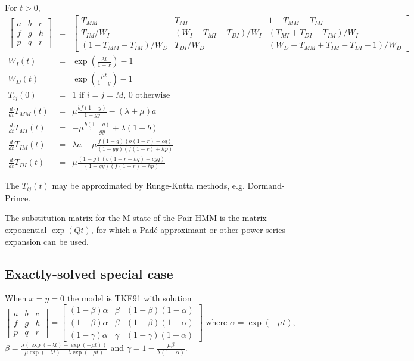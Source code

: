 \documentclass{article}
\begin{document}
For $t>0$, %
\begin{eqnarray*}
\begin{bmatrix}
a & b & c \\
f & g & h \\
p & q & r 
\end{bmatrix}
& = &
\begin{bmatrix}
T_{MM} & T_{MI} & 1-T_{MM}-T_{MI} \\
T_{IM}/W_I & (W_I-T_{MI}-T_{DI})/W_I & (T_{MI}+T_{DI}-T_{IM})/W_I \\
(1-T_{MM}-T_{IM})/W_D & T_{DI}/W_D & (W_D+T_{MM}+T_{IM}-T_{DI}-1)/W_D 
\end{bmatrix}
\\
W_I(t) & = & \exp\left(\frac{\lambda t}{1-x}\right)-1 \\
W_D(t) & = & \exp\left(\frac{\mu t}{1-y}\right)-1 \\
T_{ij}(0) & = & \mbox{1 if $i=j=M$, 0 otherwise}
\\
  \frac{d}{dt} T_{MM}(t) & = &
  \mu \frac{b f (1-y)}{1 - g y}-(\lambda +\mu )a
  \nonumber \\
  \frac{d}{dt} T_{MI}(t) & = &
  -\mu \frac{b (1-g)}{1 - g y} + \lambda (1-b)
  \nonumber \\
  \frac{d}{dt} T_{IM}(t) & = &
  \lambda a - \mu \frac{f (1-g) (b (1-r)+c q)}{(1 - g y) (f (1-r)+h p)}
  \nonumber \\
  \frac{d}{dt} T_{DI}(t) & = &
  \mu \frac{(1-g) (b (1-r-h q)+c g q)}{(1-g y) (f (1-r)+h p)}
\end{eqnarray*}

The $T_{ij}(t)$ may be approximated by Runge-Kutta methods,
e.g. Dormand-Prince. %

The substitution matrix for the M state of the Pair HMM is
the matrix exponential $\exp(Qt)$, for which a Pad\'{e} approximant
or other power series expansion can be used. %

\subsection{Exactly-solved special case}

When $x=y=0$ the model is TKF91 \cite{ThorneEtAl91}
with solution
$
\begin{bmatrix}
a & b & c \\
f & g & h \\
p & q & r 
\end{bmatrix}
=
\begin{bmatrix}
(1-\beta)\alpha & \beta & (1-\beta)(1-\alpha) \\
(1-\beta)\alpha & \beta & (1-\beta)(1-\alpha) \\
(1-\gamma)\alpha & \gamma & (1-\gamma)(1-\alpha)
\end{bmatrix}
$
where
$\alpha = \exp(-\mu t)$,
$\beta = \frac{\lambda \left( \exp(-\lambda t) - \exp(-\mu t) \right)}{\mu \exp(-\lambda t) - \lambda \exp(-\mu t)}$
and
$\gamma = 1 - \frac{\mu \beta}{\lambda (1 - \alpha)}$.
\end{document}

